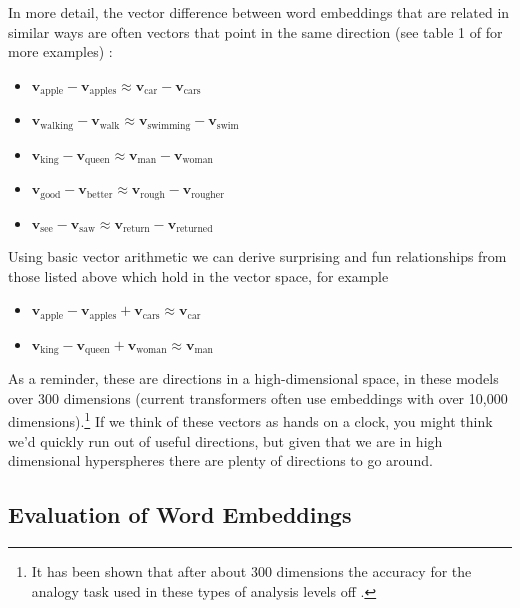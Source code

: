 In more detail, the vector difference between word embeddings that are related in similar ways are often vectors that point in the same direction (see table 1 of \cite{mikolov2013linguistic} for more examples) :

\begin{itemize}
  \item $\textbf{v}_\text{apple} - \textbf{v}_\text{apples} \approx \textbf{v}_\text{car} - \textbf{v}_\text{cars}$
  \item $\textbf{v}_\text{walking} - \textbf{v}_\text{walk} \approx \textbf{v}_\text{swimming} - \textbf{v}_\text{swim}$
  \item $\textbf{v}_\text{king} - \textbf{v}_\text{queen} \approx \textbf{v}_\text{man} - \textbf{v}_\text{woman}$
  \item $\textbf{v}_\text{good} - \textbf{v}_\text{better} \approx \textbf{v}_\text{rough} - \textbf{v}_\text{rougher}$
  \item $\textbf{v}_\text{see} - \textbf{v}_\text{saw} \approx \textbf{v}_\text{return} - \textbf{v}_\text{returned}$
\end{itemize}

Using basic vector arithmetic we can derive surprising and fun relationships from those listed above which hold in the vector space, for example

\begin{itemize}
  \item $\textbf{v}_\text{apple} - \textbf{v}_\text{apples} + \textbf{v}_\text{cars} \approx \textbf{v}_\text{car} $
  \item $\textbf{v}_\text{king} - \textbf{v}_\text{queen} + \textbf{v}_\text{woman} \approx  \textbf{v}_\text{man}$
\end{itemize}

As a reminder, these are directions in a high-dimensional space, in these models over 300 dimensions (current transformers often use embeddings with over 10,000 dimensions).\footnote{It has been shown that after about 300 dimensions the accuracy for the analogy task used in these types of analysis levels off \cite{pennington2014glove}.}  If we think of these vectors as hands on a clock, you might think we'd quickly run out of useful directions, but given that we are in high dimensional hyperspheres there are plenty of directions to go around.


\subsection{Evaluation of Word Embeddings}

